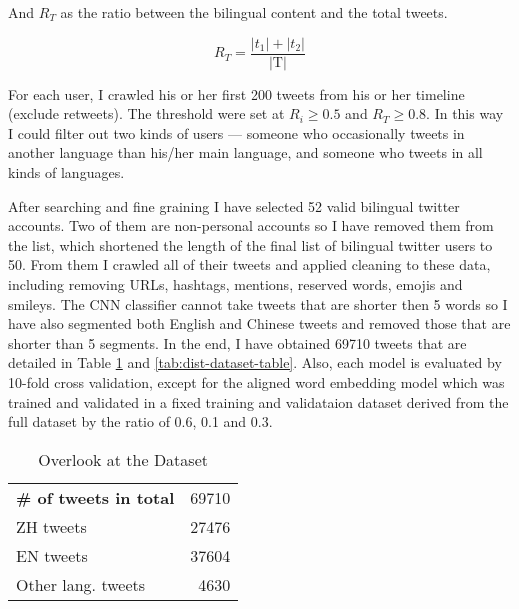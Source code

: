 \documentclass[11pt,a4paper]{article}
\begin{document}
And $R_T$ as the ratio between the bilingual content and the total tweets.

\begin{equation}
  R_T = \frac{|t_1|+|t_2|}{\text{|T|}}
\end{equation}

For each user, I crawled his or her first 200 tweets from his or her timeline (exclude retweets). The threshold were set at $R_i \ge 0.5$ and $R_T \ge 0.8$. In this way I could filter out two kinds of users --- someone who occasionally tweets in another language than his/her main language, and someone who tweets in all kinds of languages.

After searching and fine graining I have selected 52 valid bilingual twitter accounts. Two of them are non-personal accounts so I have removed them from the list, which shortened the length of the final list of bilingual twitter users to 50. From them I crawled all of their tweets and applied cleaning to these data, including removing URLs, hashtags, mentions, reserved words, emojis and smileys. The CNN classifier cannot take tweets that are shorter then 5 words so I have also segmented both English and Chinese tweets and removed those that are shorter than 5 segments. In the end, I have obtained 69710 tweets that are detailed in Table \ref{tab:overlook-dataset-table} and \ref{tab:dist-dataset-table}. Also, each model is evaluated by 10-fold cross validation, except for the aligned word embedding model which was trained and validated in a fixed training and validataion dataset derived from the full dataset by the ratio of 0.6, 0.1 and 0.3.

\begin{table}[t]
  \begin{center}
  \begin{tabular}{|l|r|}
  \hline \bf \# of tweets in total & 69710 \\
  \hspace{0.5cm} ZH tweets & 27476 \\
  \hspace{0.5cm} EN tweets & 37604 \\
  \hspace{0.5cm} Other lang. tweets & 4630 \\
  \hline
  \end{tabular}
  \end{center}
  \caption{\label{tab:overlook-dataset-table} Overlook at the Dataset}
\end{table}
\end{document}
